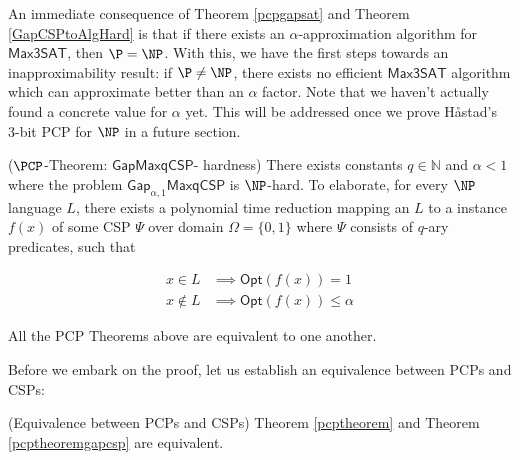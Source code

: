 An immediate consequence of Theorem \ref{pcpgapsat} and Theorem \ref{GapCSPtoAlgHard} is that if there exists an $\alpha$-approximation algorithm for $\mathsf{Max3SAT}$, then $\P = \NP$. With this, we have the first steps towards an inapproximability result: if $\P \neq \NP$, there exists no efficient $\mathsf{Max3SAT}$ algorithm which can approximate better than an $\alpha$ factor. Note that we haven't actually found a concrete value for $\alpha$ yet. This will be addressed once we prove H\aa stad's 3-bit PCP for $\NP$ in a future section.


\begin{theorem} \label{pcptheoremgapcsp}  ($\PCP$-Theorem: $\mathsf{GapMaxqCSP}$- hardness) There exists constants $q \in \mathbb{N}$ and $\alpha < 1$ where the problem $\mathsf{Gap}_{\alpha,1}\mathsf{MaxqCSP}$ is $\NP$-hard. To elaborate, for every $\NP$ language $L$, there exists a polynomial time reduction mapping an $L$ to a instance $f(x)$ of some CSP $\Psi$ over domain $\Omega=\{0,1\}$ where $\Psi$ consists of $q$-ary predicates, such that

\begin{align*}
  x \in L & \implies \mathsf{Opt}(f(x)) = 1 \\
  x \not\in L & \implies \mathsf{Opt}(f(x)) \leq \alpha
\end{align*}
\end{theorem}

\begin{theorem}
  All the PCP Theorems above are equivalent to one another.
\end{theorem}

Before we embark on the proof, let us establish an equivalence between PCPs and CSPs:

\begin{lemma} \label{equipcpcsp} (Equivalence between PCPs and CSPs)
  Theorem \ref{pcptheorem} and  Theorem \ref{pcptheoremgapcsp} are equivalent.
\end{lemma}

